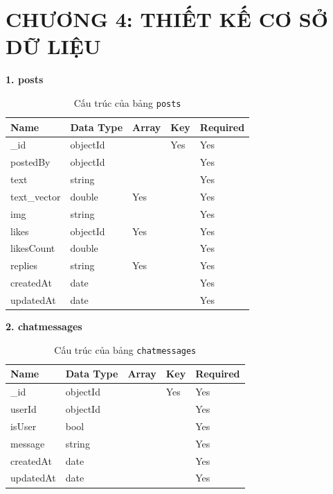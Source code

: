 \newpage
\section{\textbf{ CHƯƠNG 4: THIẾT KẾ CƠ SỞ DỮ LIỆU}}

\textbf{1. posts}

\begin{table}[H]
\centering
\renewcommand{\arraystretch}{1.3}
\begin{tabular}{|p{4cm}|p{4cm}|p{2cm}|p{2cm}|p{2cm}|}
\hline
\textbf{Name} & \textbf{Data Type} & \textbf{Array} & \textbf{Key} & \textbf{Required} \\
\hline
\_id         & objectId &  & Yes & Yes \\
postedBy     & objectId &  &     & Yes \\
text         & string   &  &     & Yes \\
text\_vector & double   & Yes &     & Yes \\
img          & string   &  &     & Yes \\
likes        & objectId & Yes &     & Yes \\
likesCount   & double   &  &     & Yes \\
replies      & string   & Yes &     & Yes \\
createdAt    & date     &  &     & Yes \\
updatedAt    & date     &  &     & Yes \\
\hline
\end{tabular}
\caption{Cấu trúc của bảng \texttt{posts}}
\end{table}


\textbf{2. chatmessages}

\begin{table}[H]
\centering
\renewcommand{\arraystretch}{1.3}
\begin{tabular}{|p{4cm}|p{4cm}|p{2cm}|p{2cm}|p{2cm}|}
\hline
\textbf{Name} & \textbf{Data Type} & \textbf{Array} & \textbf{Key} & \textbf{Required} \\
\hline
\_id         & objectId &  & Yes & Yes \\
userId       & objectId &  &     & Yes \\
isUser       & bool     &  &     & Yes \\
message      & string   &  &     & Yes \\
createdAt    & date     &  &     & Yes \\
updatedAt    & date     &  &     & Yes \\
\hline
\end{tabular}
\caption{Cấu trúc của bảng \texttt{chatmessages}}
\end{table}

